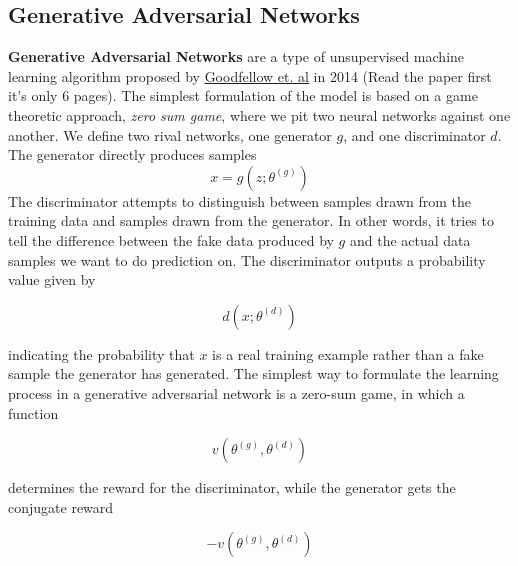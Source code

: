 \documentclass[%
oneside,                 %
final,                   %
10pt]{article}
\begin{document}
\subsection{Generative Adversarial Networks}
\textbf{Generative Adversarial Networks} are a type of unsupervised machine learning
algorithm proposed by \href{{https://arxiv.org/pdf/1406.2661.pdf}}{Goodfellow et. al}
in 2014 (Read the paper first it's only 6 pages). The simplest formulation of
the model is based on a game theoretic approach, \emph{zero sum game}, where we pit
two neural networks against one another. We define two rival networks, one
generator $g$, and one discriminator $d$. The generator directly produces
samples
\begin{equation}
    x = g(z; \theta^{(g)})
\end{equation}
The discriminator attempts to distinguish between samples drawn from the
training data and samples drawn from the generator. In other words, it tries to
tell the difference between the fake data produced by $g$ and the actual data
samples we want to do prediction on. The discriminator outputs a probability
value given by

\begin{equation}
    d(x; \theta^{(d)})
\end{equation}

indicating the probability that $x$ is a real training example rather than a
fake sample the generator has generated. The simplest way to formulate the
learning process in a generative adversarial network is a zero-sum game, in
which a function

\begin{equation}
    v(\theta^{(g)}, \theta^{(d)})
\end{equation}

determines the reward for the discriminator, while the generator gets the
conjugate reward

\begin{equation}
    -v(\theta^{(g)}, \theta^{(d)})
\end{equation}
\end{document}
